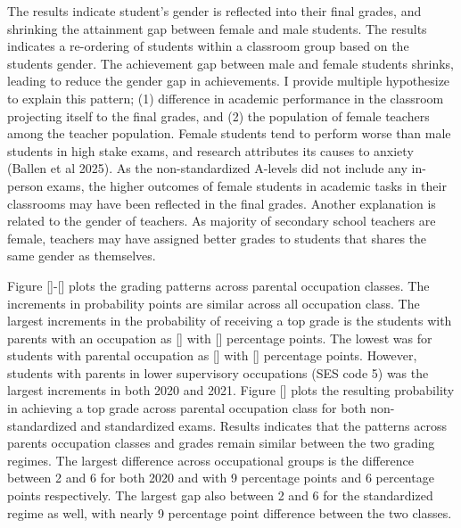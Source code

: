 The results indicate student's gender is reflected into their final grades, and shrinking the attainment gap between female and male students. The results indicates a re-ordering of students within a classroom group based on the students gender. The achievement gap between male and female students shrinks, leading to reduce the gender gap in achievements. I provide multiple 
hypothesize to explain this pattern; (1) difference in academic performance in the classroom projecting itself to the final grades, and (2) the population of female teachers among the teacher population. Female students tend to perform worse than male students in high stake exams, and research attributes its causes to anxiety (Ballen et al 2025). As the non-standardized A-levels did not include any in-person exams, the higher outcomes of female students in academic tasks in their classrooms may have been reflected in the final grades. Another explanation is related to the gender of teachers. As majority of secondary school teachers are female, teachers may have assigned better grades to students that shares the same gender as themselves.

Figure []-[] plots the grading patterns across parental occupation classes. The increments in probability points are similar across all occupation class. The largest increments in the probability of receiving a top grade is the students with parents with an occupation as [] with [] percentage points. The lowest was for students with parental occupation as [] with [] percentage points. However, students with parents in lower supervisory occupations (SES code 5) was the largest increments in both 2020 and 2021. Figure [] plots the resulting probability in achieving a top grade across parental occupation class for both non-standardized and standardized exams. Results indicates that the patterns across parents occupation classes and grades remain similar between the two grading regimes. The largest difference across occupational groups is the difference between 2 and 6 for both 2020 and with 9 percentage points and 6 percentage points respectively. The largest gap also between 2 and 6 for the standardized regime as well, with nearly 9 percentage point difference between the two classes. 

